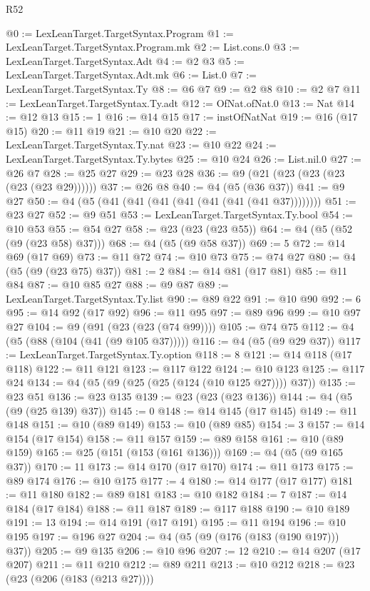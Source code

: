 \begin{lexlean}{R52}
\begin{coremodule}
@0 := LexLeanTarget.TargetSyntax.Program
@1 := LexLeanTarget.TargetSyntax.Program.mk
@2 := List.cons.{0}
@3 := LexLeanTarget.TargetSyntax.Adt
@4 := @2 @3
@5 := LexLeanTarget.TargetSyntax.Adt.mk
@6 := List.{0}
@7 := LexLeanTarget.TargetSyntax.Ty
@8 := @6 @7
@9 := @2 @8
@10 := @2 @7
@11 := LexLeanTarget.TargetSyntax.Ty.adt
@12 := OfNat.ofNat.{0}
@13 := Nat
@14 := @12 @13
@15 := 1
@16 := @14 @15
@17 := instOfNatNat
@19 := @16 (@17 @15)
@20 := @11 @19
@21 := @10 @20
@22 := LexLeanTarget.TargetSyntax.Ty.nat
@23 := @10 @22
@24 := LexLeanTarget.TargetSyntax.Ty.bytes
@25 := @10 @24
@26 := List.nil.{0}
@27 := @26 @7
@28 := @25 @27
@29 := @23 @28
@36 := @9 (@21 (@23 (@23 (@23 (@23 (@23 @29))))))
@37 := @26 @8
@40 := @4 (@5 (@36 @37))
@41 := @9 @27
@50 := @4 (@5 (@41 (@41 (@41 (@41 (@41 (@41 (@41 @37))))))))
@51 := @23 @27
@52 := @9 @51
@53 := LexLeanTarget.TargetSyntax.Ty.bool
@54 := @10 @53
@55 := @54 @27
@58 := @23 (@23 (@23 @55))
@64 := @4 (@5 (@52 (@9 (@23 @58) @37)))
@68 := @4 (@5 (@9 @58 @37))
@69 := 5
@72 := @14 @69 (@17 @69)
@73 := @11 @72
@74 := @10 @73
@75 := @74 @27
@80 := @4 (@5 (@9 (@23 @75) @37))
@81 := 2
@84 := @14 @81 (@17 @81)
@85 := @11 @84
@87 := @10 @85 @27
@88 := @9 @87
@89 := LexLeanTarget.TargetSyntax.Ty.list
@90 := @89 @22
@91 := @10 @90
@92 := 6
@95 := @14 @92 (@17 @92)
@96 := @11 @95
@97 := @89 @96
@99 := @10 @97 @27
@104 := @9 (@91 (@23 (@23 (@74 @99))))
@105 := @74 @75
@112 := @4 (@5 (@88 (@104 (@41 (@9 @105 @37)))))
@116 := @4 (@5 (@9 @29 @37))
@117 := LexLeanTarget.TargetSyntax.Ty.option
@118 := 8
@121 := @14 @118 (@17 @118)
@122 := @11 @121
@123 := @117 @122
@124 := @10 @123
@125 := @117 @24
@134 := @4 (@5 (@9 (@25 (@25 (@124 (@10 @125 @27)))) @37))
@135 := @23 @51
@136 := @23 @135
@139 := @23 (@23 (@23 @136))
@144 := @4 (@5 (@9 (@25 @139) @37))
@145 := 0
@148 := @14 @145 (@17 @145)
@149 := @11 @148
@151 := @10 (@89 @149)
@153 := @10 (@89 @85)
@154 := 3
@157 := @14 @154 (@17 @154)
@158 := @11 @157
@159 := @89 @158
@161 := @10 (@89 @159)
@165 := @25 (@151 (@153 (@161 @136)))
@169 := @4 (@5 (@9 @165 @37))
@170 := 11
@173 := @14 @170 (@17 @170)
@174 := @11 @173
@175 := @89 @174
@176 := @10 @175
@177 := 4
@180 := @14 @177 (@17 @177)
@181 := @11 @180
@182 := @89 @181
@183 := @10 @182
@184 := 7
@187 := @14 @184 (@17 @184)
@188 := @11 @187
@189 := @117 @188
@190 := @10 @189
@191 := 13
@194 := @14 @191 (@17 @191)
@195 := @11 @194
@196 := @10 @195
@197 := @196 @27
@204 := @4 (@5 (@9 (@176 (@183 (@190 @197))) @37))
@205 := @9 @135
@206 := @10 @96
@207 := 12
@210 := @14 @207 (@17 @207)
@211 := @11 @210
@212 := @89 @211
@213 := @10 @212
@218 := @23 (@23 (@206 (@183 (@213 @27))))

\end{coremodule}
\end{lexlean}
